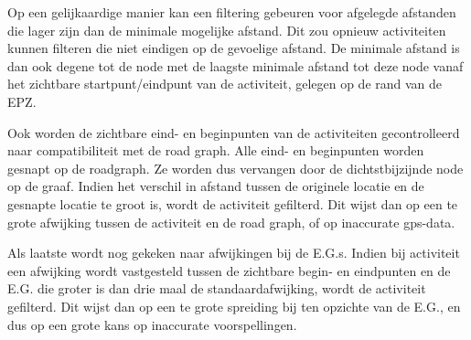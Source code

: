 Op een gelijkaardige manier kan een filtering gebeuren voor afgelegde afstanden
die lager zijn dan de minimale mogelijke afstand. Dit zou opnieuw activiteiten
kunnen filteren die niet eindigen op de gevoelige afstand. De minimale afstand
is dan ook degene tot de node met de laagste minimale afstand tot deze node
vanaf het zichtbare startpunt/eindpunt van de activiteit, gelegen op de rand
van de \ac{EPZ}.

Ook worden de zichtbare eind- en beginpunten van de activiteiten gecontrolleerd
naar compatibiliteit met de road graph. Alle eind- en beginpunten worden
gesnapt op de roadgraph. Ze worden dus vervangen door de dichtstbijzijnde node
op de graaf. Indien het verschil in afstand tussen de originele locatie en de
gesnapte locatie te groot is, wordt de activiteit gefilterd. Dit wijst dan op
een te grote afwijking tussen de activiteit en de road graph, of op inaccurate
gps-data.

Als laatste wordt nog gekeken naar afwijkingen bij de \acp{E.G.}. Indien bij
activiteit een afwijking wordt vastgesteld tussen de zichtbare begin- en
eindpunten en de \ac{E.G.} die groter is dan drie maal de standaardafwijking,
wordt de activiteit gefilterd. Dit wijst dan op een te grote spreiding bij ten
opzichte van de \ac{E.G.}, en dus op een grote kans op inaccurate
voorspellingen.

